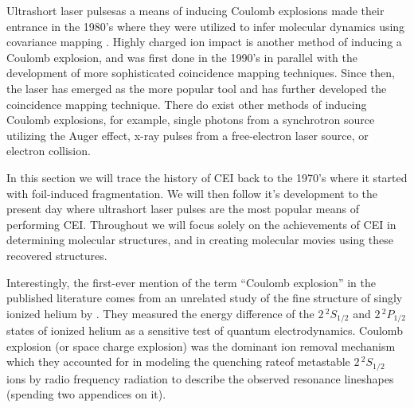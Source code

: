 Ultrashort laser pulses\footnotemark as a means of inducing Coulomb explosions made their entrance in the 1980's where they were utilized to infer molecular dynamics using covariance mapping \citep{Frasinski89}. Highly charged ion impact is another method of inducing a Coulomb explosion, and was first done in the 1990's in parallel with the development of more sophisticated coincidence mapping techniques. Since then, the laser has emerged as the more popular tool and has further developed the coincidence mapping technique. There do exist other methods of inducing Coulomb explosions, for example, single photons from a synchrotron source utilizing the Auger effect, x-ray pulses from a free-electron laser source, or electron collision.


In this section we will trace the history of CEI back to the 1970's where it started with foil-induced fragmentation. We will then follow it's development to the present day where ultrashort laser pulses are the most popular means of performing CEI. Throughout we will focus solely on the achievements of CEI in determining molecular structures, and in creating molecular movies using these recovered structures.\footnotemark


Interestingly, the first-ever mention of the term ``Coulomb explosion'' in the published literature comes from an unrelated study of the fine structure of singly ionized helium by \citet{Novick55}. They measured the energy difference of the $2 \, ^2 S_{1/2}$ and $2 \, ^2 P_{1/2}$ states of ionized helium as a sensitive test of quantum electrodynamics. Coulomb explosion (or space charge explosion) was the dominant ion removal mechanism which they accounted for in modeling the quenching rate\footnotemark of metastable $2 \, ^2 S_{1/2}$ ions by radio frequency radiation to describe the observed resonance lineshapes (spending two appendices on it).


